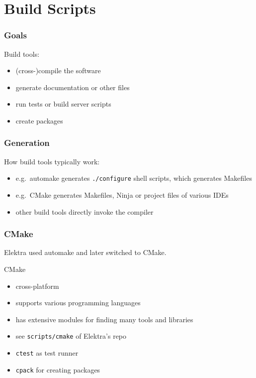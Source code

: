\section{Build Scripts}

\begin{frame}
	\frametitle{Goals}

	Build tools:

	\begin{itemize}[<+-| alert@+>]
	\item (cross-)compile the software
	\item generate documentation or other files
	\item run tests or build server scripts
	\item create packages
	\end{itemize}
\end{frame}

\begin{frame}
	\frametitle{Generation}

	How build tools typically work:

	\begin{itemize}[<+-| alert@+>]
	\item e.g.\ automake generates \texttt{./configure} shell scripts, which generates Makefiles
	\item e.g.\ CMake generates Makefiles, Ninja or project files of various IDEs
	\item other build tools directly invoke the compiler
	\end{itemize}
\end{frame}

\begin{frame}
	\frametitle{CMake}

	Elektra used automake and later switched to CMake.

	\vspace{1cm}

	CMake

	\begin{itemize}[<+-| alert@+>]
	\item cross-platform
	\item supports various programming languages
	\item has extensive modules for finding many tools and libraries
	\item see \texttt{scripts/cmake} of Elektra's repo
	\item \texttt{ctest} as test runner
	\item \texttt{cpack} for creating packages
	\end{itemize}
\end{frame}

